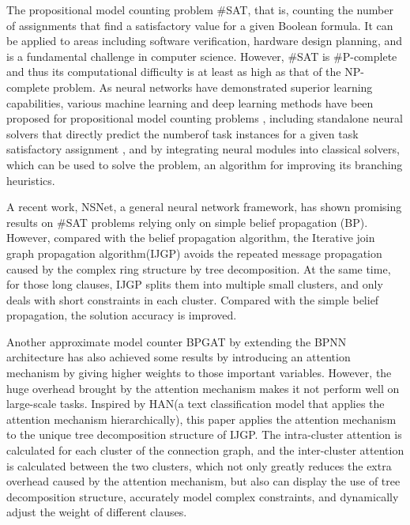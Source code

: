 The propositional model counting problem \#SAT, that is, counting the number of assignments 
that find a satisfactory value for a given Boolean formula. It can be applied to areas including
software verification\cite{DBLP:journals/fmsd/ClarkeBRZ01}\cite{DBLP:journals/tcs/IvancicYGGA08}, 
hardware design planning\cite{DBLP:conf/dac/SilvaS00}\cite{DBLP:conf/fmcad/SheeranSS00}\cite{DBLP:conf/aips/DomshlakH06}, 
and is a fundamental challenge in computer science. However, \#SAT is \#P-complete and thus its 
computational difficulty is at least as high as that of the NP-complete problem. As neural networks
have demonstrated superior learning capabilities, various machine learning and deep learning methods 
have been proposed for propositional model counting problems\cite{DBLP:conf/aaai/VaezipoorLWMGSB21}
\cite{Atkari_2019_10}\cite{DBLP:conf/ijcnn/OzolinsFDGZK22}, including standalone neural solvers that 
directly predict the numberof task instances for a given task satisfactory assignment \cite{DBLP:conf/iclr/AmizadehMW19}
\cite{DBLP:journals/corr/abs-1903-01969}, and by integrating neural modules into classical solvers, 
which can be used to solve the problem, an algorithm for improving its branching heuristics.

A recent work, NSNet\cite{DBLP:conf/nips/LiS22}, a general neural network framework, has shown promising 
results on \#SAT problems relying only on simple belief propagation (BP). However, compared with the belief 
propagation algorithm, the Iterative join graph propagation algorithm(IJGP)\cite{DBLP:journals/corr/abs-1301-0564} 
avoids the repeated message propagation caused by the complex ring structure by tree decomposition. At the 
same time, for those long clauses, IJGP splits them into multiple small clusters, and only deals with short 
constraints in each cluster. Compared with the simple belief propagation, the solution accuracy is improved.

Another approximate model counter BPGAT\cite{DBLP:conf/esann/Saveri22} by extending the BPNN\cite{DBLP:conf/nips/KuckCTLSSE20} 
architecture has also achieved some results by introducing an attention mechanism by giving higher weights 
to those important variables. However, the huge overhead brought by the attention mechanism makes it not 
perform well on large-scale tasks. Inspired by HAN\cite{DBLP:conf/naacl/YangYDHSH16}(a text classification 
model that applies the attention mechanism hierarchically), this paper applies the attention mechanism to the 
unique tree decomposition structure of IJGP. The intra-cluster attention is calculated for each cluster of 
the connection graph, and the inter-cluster attention is calculated between the two clusters, which not only 
greatly reduces the extra overhead caused by the attention mechanism, but also can display the use of tree 
decomposition structure, accurately model complex constraints, and dynamically adjust the weight of different 
clauses.

